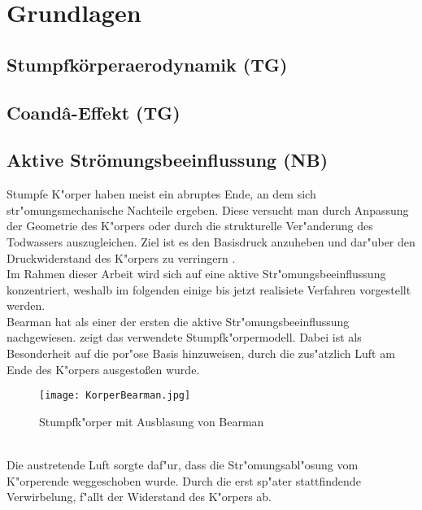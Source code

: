 \chapter{Grundlagen}\label{s:grundlagen}

\section{Stumpfk\"orperaerodynamik (TG)}

\section{Coand\^{a}-Effekt (TG)}

\section{Aktive Str\"omungsbeeinflussung (NB)}

Stumpfe K"orper haben meist ein abruptes Ende, an dem sich str"omungsmechanische Nachteile ergeben. Diese versucht man durch Anpassung der Geometrie des K"orpers oder durch die strukturelle Ver"anderung des Todwassers auszugleichen. Ziel ist es den Basisdruck anzuheben und dar"uber den Druckwiderstand des K"orpers zu verringern \cite{Hucho.2011}.\\
Im Rahmen dieser Arbeit wird sich auf eine aktive Str"omungsbeeinflussung konzentriert, weshalb im folgenden einige bis jetzt realisiete Verfahren vorgestellt werden.\\

Bearman \cite{Hucho.2011} hat als einer der ersten die aktive Str"omungsbeeinflussung nachgewiesen.  zeigt das verwendete Stumpfk"orpermodell. Dabei ist als Besonderheit auf die por"ose Basis hinzuweisen, durch die zus"atzlich Luft am Ende des K"orpers ausgesto\ss{}en wurde.
\begin{figure}[h]
	\centering
	\texttt{[image: KorperBearman.jpg]}
	\caption{Stumpfk"orper mit Ausblasung von Bearman \cite{Hucho.2011}}
	\label{fig:Bearman}
\end{figure}\\
Die austretende Luft sorgte daf"ur, dass die Str"omungsabl"osung vom K"orperende weggeschoben wurde. Durch die erst sp"ater stattfindende Verwirbelung, f"allt der Widerstand des K"orpers ab.

